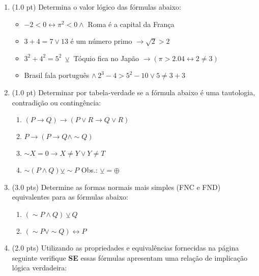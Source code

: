 \documentclass[12pt]{article}
\begin{document}
\begin{enumerate}

\item (1.0 pt) Determina o valor lógico das fórmulas abaixo:

\begin{itemize}
\item $-2 < 0 \leftrightarrow \pi^2 < 0 \wedge $ Roma é a capital da França
\item $3+4=7 \vee 13 $ é um número primo $\rightarrow \sqrt 2 > 2$
\item $3^2 + 4^2 = 5^2  ~\veebar $ Tóquio fica no Japão $\rightarrow ( \pi > 2.04 \leftrightarrow 2 \neq 3 )$
\item Brasil fala português $\wedge~ 2^3 - 4 > 5^2 - 10 \vee 5 \neq 3+3$
\end{itemize}

\item (1.0 pt) Determinar por tabela-verdade se a fórmula abaixo é uma tautologia, contradição ou contingência: 

\begin{enumerate}
\setlength{\itemsep}{-2pt}
\item $(P \rightarrow Q) \rightarrow (P \vee R \rightarrow Q \vee R)$

\item $P \rightarrow (P \rightarrow Q \wedge \sim Q)$

\item $\sim X = 0 \rightarrow X \neq Y \vee Y \neq T$

\item $\sim (P \wedge Q) \veebar \sim P$ \hspace{2cm} Obs.: $\veebar = \oplus$
\end{enumerate}


\item (3.0 pts) Determine as formas normais mais simples (FNC e FND) equivalentes para as fórmulas abaixo: 
\begin{enumerate}
\setlength{\itemsep}{-5pt}

\item $(\sim P \wedge Q) \veebar Q$

\item $(\sim P \vee \sim Q) \leftrightarrow P$
\end{enumerate}

\item (2.0 pts) Utilizando as propriedades e equivalências
fornecidas na página seguinte verifique {\bf SE} essas fórmulas apresentam uma relaç\~ao de implicaç\~ao lógica  
verdadeira:


\end{enumerate}
\end{document}
